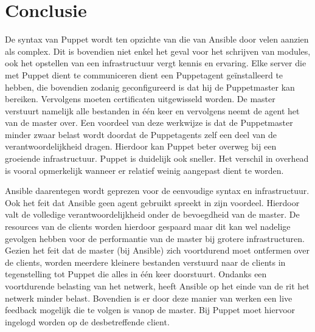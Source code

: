 
\chapter{Conclusie}
\label{ch:conclusie}

 De syntax van Puppet  wordt ten opzichte van die van Ansible door velen aanzien als complex. Dit is bovendien niet enkel het geval voor het schrijven van modules, ook het opstellen van een infrastructuur vergt kennis en ervaring. Elke server die met Puppet dient te communiceren dient een Puppetagent ge\"installeerd te hebben, die bovendien zodanig geconfigureerd is dat hij de Puppetmaster kan bereiken. Vervolgens moeten certificaten uitgewisseld worden. De master verstuurt namelijk alle bestanden in \'e\'en keer en vervolgens neemt de agent het van de master over. Een voordeel van deze werkwijze is dat de Puppetmaster minder zwaar belast wordt doordat de Puppetagents zelf een deel van de verantwoordelijkheid dragen. Hierdoor kan Puppet beter overweg bij een groeiende infrastructuur. Puppet is duidelijk ook sneller. Het verschil in overhead is vooral opmerkelijk wanneer er relatief weinig aangepast dient te worden. 

Ansible daarentegen wordt geprezen voor de eenvoudige syntax en infrastructuur. Ook het feit dat Ansible geen agent gebruikt spreekt in zijn voordeel. Hierdoor valt de volledige verantwoordelijkheid onder de bevoegdheid van de master. De resources van de clients worden hierdoor gespaard maar dit kan wel nadelige gevolgen hebben voor de performantie van de master bij grotere infrastructuren. Gezien het feit dat de master (bij Ansible) zich voortdurend moet ontfermen over de clients, worden meerdere kleinere bestanden verstuurd naar de clients in tegenstelling tot Puppet die alles in \'e\'en keer doorstuurt. Ondanks een voortdurende belasting van het netwerk, heeft Ansible op het einde van de rit het netwerk minder belast. Bovendien is er door deze manier van werken een live feedback mogelijk die te volgen is vanop de master. Bij Puppet moet hiervoor ingelogd worden op de desbetreffende client.




